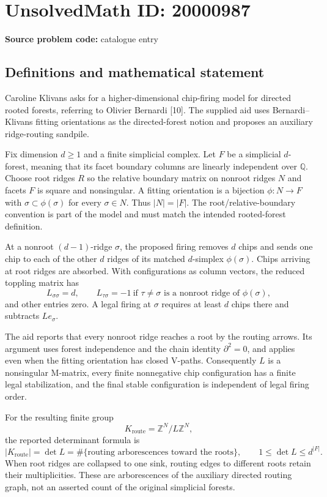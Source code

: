 \documentclass[11pt]{article}
\newcommand{\Z}{\mathbb{Z}}
\newcommand{\Q}{\mathbb{Q}}
\begin{document}
\section*{UnsolvedMath ID: 20000987}
\textbf{Source problem code:} catalogue entry
\subsection{Definitions and mathematical statement}
Caroline Klivans asks for a higher-dimensional chip-firing model for directed rooted forests, referring to Olivier Bernardi [10]. The supplied aid uses Bernardi--Klivans fitting orientations as the directed-forest notion and proposes an auxiliary ridge-routing sandpile.

Fix dimension $d\geq1$ and a finite simplicial complex. Let $F$ be a simplicial $d$-forest, meaning that its facet boundary columns are linearly independent over $\Q$. Choose root ridges $R$ so the relative boundary matrix on nonroot ridges $N$ and facets $F$ is square and nonsingular. A fitting orientation is a bijection $\phi:N\to F$ with $\sigma\subset\phi(\sigma)$ for every $\sigma\in N$. Thus $|N|=|F|$. The root/relative-boundary convention is part of the model and must match the intended rooted-forest definition.

At a nonroot $(d-1)$-ridge $\sigma$, the proposed firing removes $d$ chips and sends one chip to each of the other $d$ ridges of its matched $d$-simplex $\phi(\sigma)$. Chips arriving at root ridges are absorbed. With configurations as column vectors, the reduced toppling matrix has
\[
 L_{\sigma\sigma}=d,\qquad
 L_{\tau\sigma}=-1\ \text{if }\tau\neq\sigma\text{ is a nonroot ridge of }\phi(\sigma),
\]
and other entries zero. A legal firing at $\sigma$ requires at least $d$ chips there and subtracts $L e_\sigma$.

The aid reports that every nonroot ridge reaches a root by the routing arrows. Its argument uses forest independence and the chain identity $\partial^2=0$, and applies even when the fitting orientation has closed V-paths. Consequently $L$ is a nonsingular M-matrix, every finite nonnegative chip configuration has a finite legal stabilization, and the final stable configuration is independent of legal firing order.

For the resulting finite group
\[
 K_{\mathrm{route}}=\Z^N/L\Z^N,
\]
the reported determinant formula is
\[
 |K_{\mathrm{route}}|=\det L
 =\#\{\text{routing arborescences toward the roots}\},\qquad
 1\leq\det L\leq d^{|F|}.
\]
When root ridges are collapsed to one sink, routing edges to different roots retain their multiplicities. These are arborescences of the auxiliary directed routing graph, not an asserted count of the original simplicial forests.
\end{document}
